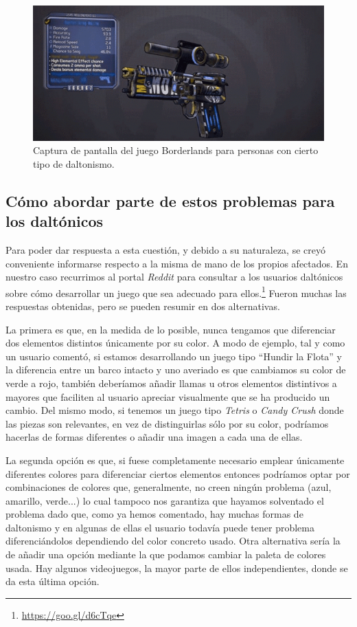 \begin{figure}[H]
		\includegraphics[width=\textwidth,height=\textheight,keepaspectratio]{./img/borderlandscolorblind.png}
	\caption{Captura de pantalla del juego Borderlands para personas con cierto tipo de daltonismo.}
	\label{fig:borderlandscolorblind}
\end{figure}

\subsection{Cómo abordar parte de estos problemas para los daltónicos}
\label{sec:daltonicossolventar}

Para poder dar respuesta a esta cuestión, y debido a su naturaleza, se creyó conveniente informarse respecto a la misma de mano de los propios afectados. En nuestro caso recurrimos al portal \textit{Reddit} para consultar a los usuarios daltónicos sobre cómo desarrollar un juego que sea adecuado para ellos.\footnote{\url{https://goo.gl/d6cTqe}} Fueron muchas las respuestas obtenidas, pero se pueden resumir en dos alternativas.

La primera es que, en la medida de lo posible, nunca tengamos que diferenciar dos elementos distintos únicamente por su color. A modo de ejemplo, tal y como un usuario comentó, si estamos desarrollando un juego tipo ``Hundir la Flota'' y la diferencia entre un barco intacto y uno averiado es que cambiamos su color de verde a rojo, también deberíamos añadir llamas u otros elementos distintivos a mayores que faciliten al usuario apreciar visualmente que se ha producido un cambio. Del mismo modo, si tenemos un juego tipo \textit{Tetris} o \textit{Candy Crush} donde las piezas son relevantes, en vez de distinguirlas sólo por su color, podríamos hacerlas de formas diferentes o añadir una imagen a cada una de ellas.

La segunda opción es que, si fuese completamente necesario emplear únicamente diferentes colores para diferenciar ciertos elementos entonces podríamos optar por combinaciones de colores que, generalmente, no creen ningún problema (azul, amarillo, verde...) lo cual tampoco nos garantiza que hayamos solventado el problema dado que, como ya hemos comentado, hay muchas formas de daltonismo y en algunas de ellas el usuario todavía puede tener problema diferenciándolos dependiendo del color concreto usado. Otra alternativa sería la de añadir una opción mediante la que podamos cambiar la paleta de colores usada. Hay algunos videojuegos, la mayor parte de ellos independientes, donde se da esta última opción. 